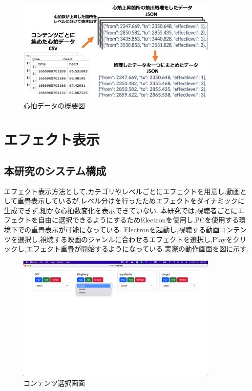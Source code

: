 \begin{figure}[H]
    \centering
    \includegraphics[width=10cm]{images/chapter3/system.png}
    \caption{心拍データの概要図}
\end{figure}







\section{エフェクト表示}
\subsection{本研究のシステム構成}
エフェクト表示方法として,カテゴリやレベルごとにエフェクトを用意し,動画として重畳表示しているが,レベル分けを行ったためエフェクトをダイナミックに生成できず,細かな心拍数変化を表示できていない.
本研究では,視聴者ごとにエフェクトを自由に選択できるようにするためElectronを使用し,PCを使用する環境下での重畳表示が可能になっている.
Electronを起動し,視聴する動画コンテンツを選択し,視聴する映画のジャンルに合わせるエフェクトを選択し,Playをクリックし,エフェクト重畳が開始するようになっている.実際の動作画面を図に示す.

\begin{figure}[H]
    \centering
    \includegraphics[width=10cm]{images/chapter3/contents.jpg}
    \caption{コンテンツ選択画面}
\end{figure}


